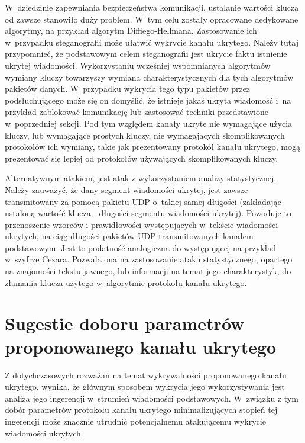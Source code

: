 \documentclass[a4paper, twoside, 12pt]{report}
\begin{document}
       W~dziedzinie zapewniania bezpieczeństwa komunikacji, ustalanie wartości
       klucza od zawsze stanowiło duży problem. W~tym celu zostały opracowane
       dedykowane algorytmy, na przykład algorytm Diffiego-Hellmana. Zastosowanie
       ich w~przypadku steganografii może ułatwić wykrycie kanału ukrytego. Należy tutaj przypomnieć,
       że podstawowym celem steganografii jest ukrycie faktu istnienie ukrytej wiadomości.
       Wykorzystaniu wcześniej wspomnianych algorytmów wymiany kluczy towarzyszy
       wymiana charakterystycznych dla tych algorytmów pakietów danych. W~przypadku
       wykrycia tego typu pakietów przez podsłuchującego może się on domyślić,
       że istnieje jakaś ukryta wiadomość i~na przykład zablokować komunikację lub
       zastosować techniki przedstawione w~poprzedniej sekcji. Pod tym względem
       kanały ukryte nie wymagające użycia kluczy, lub wymagające prostych kluczy,
       nie wymagających skomplikowanych protokołów ich wymiany, takie jak prezentowany
       protokół kanału ukrytego, mogą prezentować
       się lepiej od protokołów używających skomplikowanych kluczy.

       Alternatywnym atakiem, jest atak z wykorzystaniem analizy statystycznej.
       Należy zauważyć, że dany segment wiadomości ukrytej, jest zawsze transmitowany
       za pomocą pakietu UDP o~takiej samej długości (zakładając ustaloną wartość klucza -
       długości segmentu wiadomości ukrytej). Powoduje to przenoszenie wzorców i
       prawidłowości występujących w~tekście wiadomości ukrytych, na ciąg długości
       pakietów UDP transmitowanych kanałem podstawowym. Jest to podatność analogiczna
       do występującej na przykład w~szyfrze Cezara. Pozwala ona na zastosowanie
       ataku statystycznego, opartego na znajomości tekstu jawnego, lub informacji
       na temat jego charakterystyk, do złamania klucza użytego w~algorytmie protokołu
       kanału ukrytego.

    \section{Sugestie doboru parametrów proponowanego kanału ukrytego} \label{SUGESTIEPARAMETROW}
       Z dotychczasowych rozważań na temat wykrywalności proponowanego kanału ukrytego, wynika,
       że głównym sposobem wykrycia jego wykorzystywania jest analiza jego ingerencji
       w~strumień wiadomości podstawowych. W~związku z tym dobór parametrów protokołu
       kanału ukrytego minimalizujących stopień
       tej ingerencji może znacznie utrudnić potencjalnemu atakującemu wykrycie
       wiadomości ukrytych.
\end{document}
